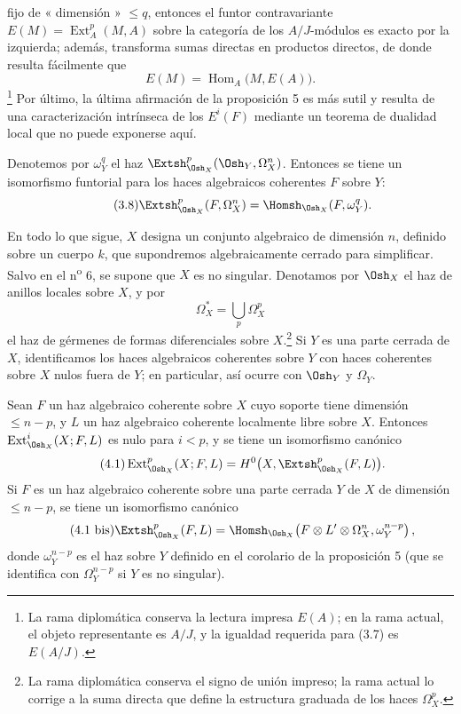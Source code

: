 fijo de « dimensión » $\leq q$, entonces el funtor contravariante
$E(M)=\operatorname{Ext}_{A}^{p}(M,A)$ sobre la categoría de los $A/J$-módulos es
exacto por la izquierda; además, transforma sumas directas en productos directos,
de donde resulta fácilmente que
\[
  E(M)=\operatorname{Hom}_{A}\bigl(M,E(A)\bigr).
\]
\footnote{La rama diplomática conserva la lectura impresa $E(A)$; en la rama
actual, el objeto representante es $A/J$, y la igualdad requerida para (3.7)
es $E(A/J)$.} Por último, la
última afirmación de la proposición 5 es más sutil y resulta de una
caracterización intrínseca de los $E^{i}(F)$ mediante un teorema de dualidad
local que no puede exponerse aquí.

 Denotemos por $\omega_Y^{q}$ el haz
$\Extsh_{\Osh_X}^{p}(\Osh_Y,\Omega_X^{n})$. Entonces se tiene un isomorfismo
funtorial para los haces algebraicos coherentes $F$ sobre $Y$:
\begin{equation}\tag{3.8}
  \Extsh_{\Osh_X}^{p}(F,\Omega_X^{n})
  =\Homsh_{\Osh_X}(F,\omega_Y^{q}).
\end{equation}


En todo lo que sigue, $X$ designa un conjunto algebraico de dimensión $n$, definido
sobre un cuerpo $k$, que supondremos algebraicamente cerrado para simplificar. Salvo
en el n\textsuperscript{o} 6, se supone que $X$ es no singular. Denotamos por
$\Osh_X$ el haz de anillos locales sobre $X$, y por
\[
  \Omega_X^{*}=\bigcup_p\Omega_X^{p}
\]
el haz de gérmenes de formas diferenciales sobre $X$.\footnote{La rama
diplomática conserva el signo de unión impreso; la rama actual lo corrige a
la suma directa que define la estructura graduada de los haces $\Omega_X^p$.}
Si $Y$ es una parte cerrada de $X$, identificamos
los haces algebraicos coherentes sobre $Y$ con haces coherentes sobre $X$
nulos fuera de $Y$; en particular, así ocurre con $\Osh_Y$ y $\Omega_Y$.

 Sean $F$ un haz algebraico coherente sobre $X$ cuyo
soporte tiene dimensión $\leq n-p$, y $L$ un haz algebraico coherente
localmente libre sobre $X$. Entonces $\operatorname{Ext}_{\Osh_X}^{i}(X;F,L)$ es nulo
para $i<p$, y se tiene un isomorfismo canónico
\begin{equation}\tag{4.1}
  \operatorname{Ext}_{\Osh_X}^{p}(X;F,L)
  =H^{0}\bigl(X,\Extsh_{\Osh_X}^{p}(F,L)\bigr).
\end{equation}
Si $F$ es un haz algebraico coherente sobre una parte cerrada $Y$ de $X$ de
dimensión $\leq n-p$, se tiene un isomorfismo canónico
\begin{equation}\tag{4.1 bis}
  \Extsh_{\Osh_X}^{p}(F,L)
  =\Homsh_{\Osh_X}\!\left(
    F\otimes L'\otimes\Omega_X^{n},\omega_Y^{n-p}
  \right),
\end{equation}
donde $\omega_Y^{n-p}$ es el haz sobre $Y$ definido en el corolario de la
proposición 5 (que se identifica con $\Omega_Y^{n-p}$ si $Y$ es no singular).

